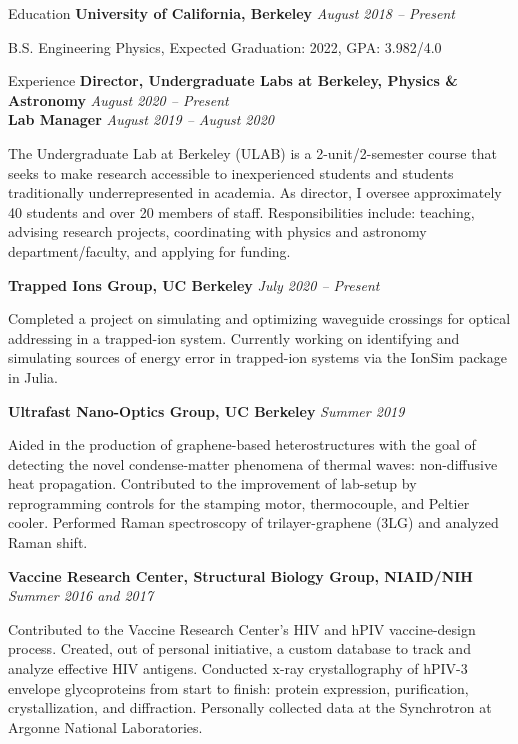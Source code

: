 \documentclass{resume}
\newenvironment{indented}{\vspace{-5pt}\begin{list}{}{\setlength{\leftmargin}{0.5cm}}\item[]}{\end{list}}
\begin{document}
	
	\begin{rSection}{Education}
		{\bf University of California, Berkeley} \hfill {\em August 2018 -- Present} 
		\begin{indented}
			B.S. Engineering Physics, Expected Graduation: 2022, GPA: 3.982/4.0
		\end{indented}
	\end{rSection}

	\begin{rSection}{Experience}
		{\bf Director, Undergraduate Labs at Berkeley, Physics \& Astronomy  } \hfill {\em August 2020 -- Present}\\
		{\bf Lab Manager } \hfill {\em August 2019 -- August 2020}
		\begin{indented}
			The Undergraduate Lab at Berkeley (ULAB) is a 2-unit/2-semester course that seeks to make research accessible to inexperienced students and students traditionally underrepresented in academia. As director, I oversee approximately 40 students and over 20 members of staff. Responsibilities include: teaching, advising research projects, coordinating with physics and astronomy department/faculty, and applying for funding.
		\end{indented}
		
		\vspace{-1pt} {\bf Trapped Ions Group, UC Berkeley} \hfill {\em July 2020 -- Present}
		\begin{indented}
			Completed a project on simulating and optimizing waveguide crossings for optical addressing in a trapped-ion system. Currently working on identifying and simulating sources of energy error in trapped-ion systems via the IonSim package in Julia.
		\end{indented}
		
		
		\vspace{-1pt} {\bf Ultrafast Nano-Optics Group, UC Berkeley} \hfill {\em Summer 2019}
		\begin{indented}
			Aided in the production of graphene-based heterostructures with the goal of detecting the novel condense-matter phenomena of thermal waves: non-diffusive heat propagation. Contributed to the improvement of lab-setup by reprogramming controls for the stamping motor, thermocouple, and Peltier cooler. Performed Raman spectroscopy of trilayer-graphene (3LG) and analyzed Raman shift.
		\end{indented}
	
		\vspace{-1pt} {\bf Vaccine Research Center, Structural Biology Group, NIAID/NIH} \hfill {\em Summer 2016 and 2017}
		\begin{indented}
			Contributed to the Vaccine Research Center's HIV and hPIV vaccine-design process. Created, out of personal initiative, a custom database to track and analyze effective HIV antigens. Conducted x-ray crystallography of hPIV-3 envelope glycoproteins from start to finish: protein expression, purification, crystallization, and diffraction. Personally collected data at the Synchrotron at Argonne National Laboratories.
		\end{indented}
		

\end{rSection}
\end{document}

